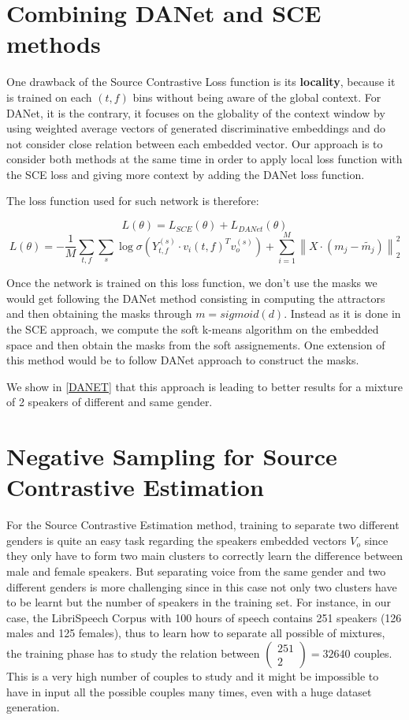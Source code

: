 \documentclass[master, tikz, final,11pt, dvipdfmx]{iscs-thesis}
\newcommand{\norm}[1]{\left\lVert#1\right\rVert}
\begin{document}
\section{Combining DANet and SCE methods}
\label{contrib:danet}

One drawback of the Source Contrastive Loss function is its \textbf{locality}, because it is trained on each $(t,f)$ bins without being aware of the global context. For DANet, it is the contrary, it focuses on the globality of the context window by using weighted average vectors of generated discriminative embeddings and do not consider close relation between each embedded vector.
Our approach is to consider both methods at the same time in order to apply local loss function with the SCE loss and giving more context by adding the DANet loss function.

The loss function used for such network is therefore:

\[L(\theta) = L_{SCE}(\theta) + L_{DANet}(\theta)\]
\[L(\theta) = - \frac{1}{M} \sum_{t,f} \sum_{s} \log \sigma(Y_{t,f}^{(s)} \cdot v_i(t,f)^{T} v_o^{(s)}) +  \sum_{i=1}^{M} \norm{X \cdot (m_j - \tilde{m_j})}^2_2 \]

Once the network is trained on this loss function, we don't use the masks we would get following the DANet method consisting in computing the attractors and then obtaining the masks through $m = sigmoid(d)$. Instead as it is done in the SCE approach, we compute the soft k-means algorithm on the embedded space and then obtain the masks from the soft assignements. One extension of this method would be to follow DANet approach to construct the masks.

We show in \autoref{DANET} that this approach is leading to better results for a mixture of 2 speakers of different and same gender.

\section{Negative Sampling for Source Contrastive Estimation}
\label{contrib:NS}

For the Source Contrastive Estimation method, training to separate two different genders is quite an easy task regarding the speakers embedded vectors $V_o$ since they only have to form two main clusters to correctly learn the difference between male and female speakers. But separating voice from the same gender and two different genders is more challenging since in this case not only two clusters have to be learnt but the number of speakers in the training set. For instance, in our case, the LibriSpeech Corpus with 100 hours of speech contains 251 speakers (126 males and 125 females), thus to learn how to separate all possible of mixtures, the training phase has to study the relation between $\left(\! \begin{array}{c} 251 \\ 2 \end{array} \!\right) = 32640 $ couples. This is a very high number of couples to study and it might be impossible to have in input all the possible couples many times, even with a huge dataset generation. 
\end{document}

